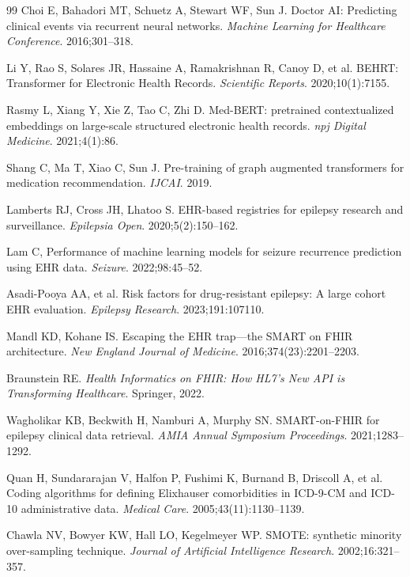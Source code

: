 \documentclass[11pt,a4paper]{article}
\begin{document}
\begin{thebibliography}{99}
Choi E, Bahadori MT, Schuetz A, Stewart WF, Sun J. Doctor AI: Predicting clinical events via recurrent neural networks. \textit{Machine Learning for Healthcare Conference}. 2016;301--318.

Li Y, Rao S, Solares JR, Hassaine A, Ramakrishnan R, Canoy D, et al. BEHRT: Transformer for Electronic Health Records. \textit{Scientific Reports}. 2020;10(1):7155.

Rasmy L, Xiang Y, Xie Z, Tao C, Zhi D. Med-BERT: pretrained contextualized embeddings on large-scale structured electronic health records. \textit{npj Digital Medicine}. 2021;4(1):86.

Shang C, Ma T, Xiao C, Sun J. Pre-training of graph augmented transformers for medication recommendation. \textit{IJCAI}. 2019.

Lamberts RJ, Cross JH, Lhatoo S. EHR-based registries for epilepsy research and surveillance. \textit{Epilepsia Open}. 2020;5(2):150--162.

Lam C, Performance of machine learning models for seizure recurrence prediction using EHR data. \textit{Seizure}. 2022;98:45--52.

Asadi-Pooya AA, et al. Risk factors for drug-resistant epilepsy: A large cohort EHR evaluation. \textit{Epilepsy Research}. 2023;191:107110.

Mandl KD, Kohane IS. Escaping the EHR trap---the SMART on FHIR architecture. \textit{New England Journal of Medicine}. 2016;374(23):2201--2203.

Braunstein RE. \textit{Health Informatics on FHIR: How HL7's New API is Transforming Healthcare}. Springer, 2022.

Wagholikar KB, Beckwith H, Namburi A, Murphy SN. SMART-on-FHIR for epilepsy clinical data retrieval. \textit{AMIA Annual Symposium Proceedings}. 2021;1283--1292.

Quan H, Sundararajan V, Halfon P, Fushimi K, Burnand B, Driscoll A, et al. Coding algorithms for defining Elixhauser comorbidities in ICD-9-CM and ICD-10 administrative data. \textit{Medical Care}. 2005;43(11):1130--1139.

Chawla NV, Bowyer KW, Hall LO, Kegelmeyer WP. SMOTE: synthetic minority over-sampling technique. \textit{Journal of Artificial Intelligence Research}. 2002;16:321--357.


\end{thebibliography}
\end{document}

